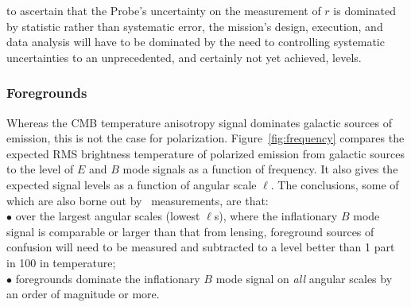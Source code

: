 to ascertain that the Probe's uncertainty on the measurement of $r$ is dominated by statistic rather than 
systematic error, the mission's design, execution, and data analysis will have to be dominated by the need
to controlling systematic uncertainties to an unprecedented, and certainly not yet achieved, levels. 

\vspace{-0.18in}

\subsubsection{Foregrounds}
\label{sec:foregrounds}

\vspace{-0.05in}


Whereas the CMB temperature anisotropy signal dominates galactic sources
of emission, this is not the case for polarization. 
Figure~\ref{fig:frequency} compares the expected RMS brightness temperature 
of polarized emission from galactic sources to the level of $E$ and $B$ mode signals
as a function of frequency. It also gives the expected signal levels as a function of angular scale $\ell$.  
The conclusions, some of which are also borne out by \planck\ measurements, are that: \\
$\bullet$ over the largest angular scales (lowest $\ell$s), where the inflationary $B$ mode 
signal is comparable or larger than that from lensing, foreground sources of confusion 
will need to be measured and subtracted to a level better than 1 part in 100 in temperature; \\
$\bullet$ foregrounds dominate the inflationary $B$ mode signal on {\it all} angular scales by 
an order of magnitude or more.

